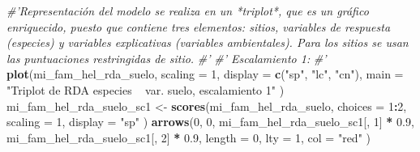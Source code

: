 \documentclass[11pt,]{article}
\newenvironment{Shaded}{\begin{snugshade}}{\end{snugshade}}
\newcommand{\KeywordTok}[1]{\textcolor[rgb]{0.13,0.29,0.53}{\textbf{#1}}}
\newcommand{\DataTypeTok}[1]{\textcolor[rgb]{0.13,0.29,0.53}{#1}}
\newcommand{\DecValTok}[1]{\textcolor[rgb]{0.00,0.00,0.81}{#1}}
\newcommand{\FloatTok}[1]{\textcolor[rgb]{0.00,0.00,0.81}{#1}}
\newcommand{\StringTok}[1]{\textcolor[rgb]{0.31,0.60,0.02}{#1}}
\newcommand{\CommentTok}[1]{\textcolor[rgb]{0.56,0.35,0.01}{\textit{#1}}}
\newcommand{\OperatorTok}[1]{\textcolor[rgb]{0.81,0.36,0.00}{\textbf{#1}}}
\newcommand{\NormalTok}[1]{#1}
\begin{document}
\begin{Shaded}
\begin{Highlighting}[]
{{{{{\CommentTok{#'Representación del modelo se realiza en un *triplot*, que es un gráfico enriquecido, puesto que contiene tres elementos: sitios, variables de respuesta (especies) y variables explicativas (variables ambientales). Para los sitios se usan las puntuaciones restringidas de sitio.}
\CommentTok{#' }
\CommentTok{#' Escalamiento 1:}
\CommentTok{#' }
\KeywordTok{plot}\NormalTok{(mi_fam_hel_rda_suelo,}
     \DataTypeTok{scaling =} \DecValTok{1}\NormalTok{,}
     \DataTypeTok{display =} \KeywordTok{c}\NormalTok{(}\StringTok{"sp"}\NormalTok{, }\StringTok{"lc"}\NormalTok{, }\StringTok{"cn"}\NormalTok{),}
     \DataTypeTok{main =} \StringTok{"Triplot de RDA especies ~ var. suelo, escalamiento 1"}
\NormalTok{)}
\NormalTok{mi_fam_hel_rda_suelo_sc1 <-}
\StringTok{  }\KeywordTok{scores}\NormalTok{(mi_fam_hel_rda_suelo,}
         \DataTypeTok{choices =} \DecValTok{1}\OperatorTok{:}\DecValTok{2}\NormalTok{,}
         \DataTypeTok{scaling =} \DecValTok{1}\NormalTok{,}
         \DataTypeTok{display =} \StringTok{"sp"}
\NormalTok{  )}
\KeywordTok{arrows}\NormalTok{(}\DecValTok{0}\NormalTok{, }\DecValTok{0}\NormalTok{,}
\NormalTok{       mi_fam_hel_rda_suelo_sc1[, }\DecValTok{1}\NormalTok{] }\OperatorTok{*}\StringTok{ }\FloatTok{0.9}\NormalTok{,}
\NormalTok{       mi_fam_hel_rda_suelo_sc1[, }\DecValTok{2}\NormalTok{] }\OperatorTok{*}\StringTok{ }\FloatTok{0.9}\NormalTok{,}
       \DataTypeTok{length =} \DecValTok{0}\NormalTok{,}
       \DataTypeTok{lty =} \DecValTok{1}\NormalTok{,}
       \DataTypeTok{col =} \StringTok{"red"}
\NormalTok{)}

}}}}}
\end{Highlighting}
\end{Shaded}
\end{document}
